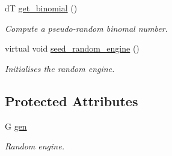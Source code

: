 \begin{DoxyCompactItemize}
\mbox{\label{classlgraph_1_1utils_1_1drandom__generator_ac6062b1bbf3ed3a45bdab7474f466b7f}} 
dT \hyperlink{classlgraph_1_1utils_1_1drandom__generator_ac6062b1bbf3ed3a45bdab7474f466b7f}{get\+\_\+binomial} ()
\begin{DoxyCompactList}\small\item\em Compute a pseudo-\/random binomal number. \end{DoxyCompactList}\item 
\mbox{\label{classlgraph_1_1utils_1_1random__generator_a4eb6998070eecb59bd89dca92d8a509c}} 
virtual void \hyperlink{classlgraph_1_1utils_1_1random__generator_a4eb6998070eecb59bd89dca92d8a509c}{seed\+\_\+random\+\_\+engine} ()
\begin{DoxyCompactList}\small\item\em Initialises the random engine. \end{DoxyCompactList}\end{DoxyCompactItemize}
\subsection*{Protected Attributes}
\begin{DoxyCompactItemize}
\item 
\mbox{\label{classlgraph_1_1utils_1_1random__generator_a18353876b4c2d3a18aee454b5750a0a0}} 
G \hyperlink{classlgraph_1_1utils_1_1random__generator_a18353876b4c2d3a18aee454b5750a0a0}{gen}
\begin{DoxyCompactList}\small\item\em Random engine. \end{DoxyCompactList}\end{DoxyCompactItemize}
